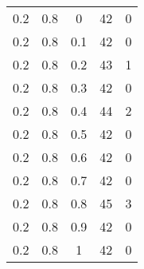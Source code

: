 \begin{table}
\begin{minipage}[ht!]{0.10\hsize}
\begin{center}
{\begin{tabular}{|c|c|c|c|c|}
					0.2  & 0.8  & 0    & 42  & 0     \\
					0.2  & 0.8  & 0.1  & 42  & 0     \\
					0.2  & 0.8  & 0.2  & 43  & 1     \\
					0.2  & 0.8  & 0.3  & 42  & 0     \\
					0.2  & 0.8  & 0.4  & 44  & 2     \\
					0.2  & 0.8  & 0.5  & 42  & 0     \\
					0.2  & 0.8  & 0.6  & 42  & 0     \\
					0.2  & 0.8  & 0.7  & 42  & 0     \\
					0.2  & 0.8  & 0.8  & 45  & 3     \\
					0.2  & 0.8  & 0.9  & 42  & 0     \\
					0.2  & 0.8  & 1    & 42  & 0     \\ \hline


\end{tabular}}
\end{center}
\end{minipage}
\end{table}
